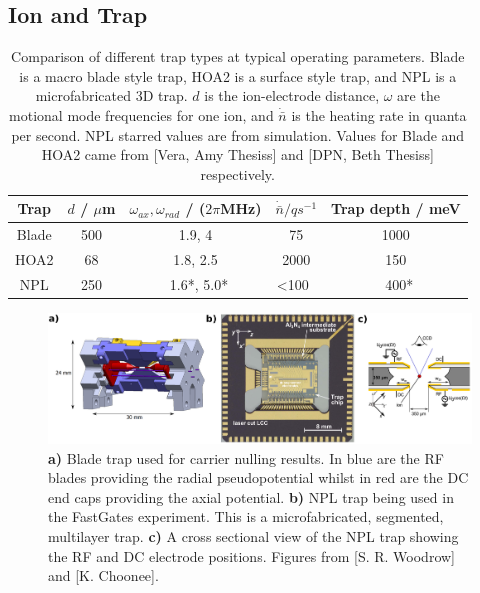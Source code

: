 \documentclass[12pt]{iopart}
\begin{document}
\subsection{Ion and Trap}

\begin{table}[h!]
\begin{center}
\begin{tabular}{ c|c c c c }
  Trap & $d$ / $\mu$m & $\omega_{ax}, \omega_{rad}$ / ($2\pi$MHz) & $\dot{\bar{n}} / qs^{-1}$ & Trap depth / meV \\ 
  \hline
  Blade  & 500 & 1.9, 4 & 75 & 1000 \\
  HOA2  & 68 & 1.8, 2.5 & 2000 & 150 \\
  NPL  & 250 & ~1.6*, 5.0* & <100~ & ~400* 
\end{tabular}
\caption{Comparison of different trap types at typical operating
  parameters. Blade is a macro blade style trap, HOA2 is a surface
  style trap, and NPL is a microfabricated 3D trap. $d$ is the
  ion-electrode distance, $\omega$ are the motional mode frequencies
  for one ion, and $\dot{\bar{n}}$ is the heating rate in quanta per
  second. NPL starred values are from simulation. Values for Blade and
  HOA2 came from [Vera, Amy Thesiss] and [DPN, Beth Thesiss]
  respectively. }
\end{center}
\label{table:trap}
\end{table}

\begin{figure}
  \begin{center}
   \noindent\includegraphics[width=\linewidth]{figures/trap_comp.png}
  \end{center}
  \caption{\textbf{a)} Blade trap used for carrier nulling results. In
    blue are the RF blades providing the radial pseudopotential whilst
    in red are the DC end caps providing the axial
    potential. \textbf{b)} NPL trap being used in the FastGates
    experiment. This is a microfabricated, segmented, multilayer
    trap. \textbf{c)} A cross sectional view of the NPL trap showing
    the RF and DC electrode positions.
    Figures from [S. R. Woodrow]
    and [K. Choonee].
  }

  \label{fig:trap}
\end{figure}
\end{document}
